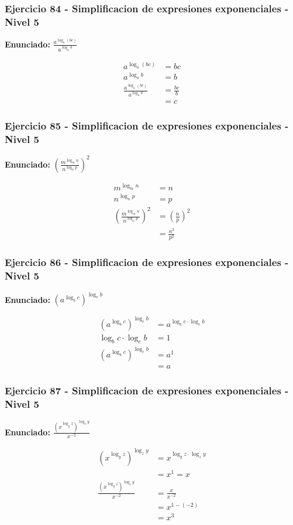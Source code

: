 \documentclass[12pt,a4paper]{article}
\begin{document}
\subsubsection*{Ejercicio 84 - Simplificacion de expresiones exponenciales - Nivel 5}
\textbf{Enunciado:} \(\frac{a^{\log_a(bc)}}{a^{\log_a b}}\)

\[
\begin{aligned}
a^{\log_a(bc)}&=bc\\
a^{\log_a b}&=b\\
\frac{a^{\log_a(bc)}}{a^{\log_a b}}&=\frac{bc}{b}\\
&=\boxed{c}
\end{aligned}
\]


\subsubsection*{Ejercicio 85 - Simplificacion de expresiones exponenciales - Nivel 5}
\textbf{Enunciado:} \(\left(\frac{m^{\log_m n}}{n^{\log_n p}}\right)^2\)

\[
\begin{aligned}
m^{\log_m n}&=n\\
n^{\log_n p}&=p\\
\left(\frac{m^{\log_m n}}{n^{\log_n p}}\right)^2&=\left(\frac np\right)^2\\
&=\boxed{\frac{n^2}{p^2}}
\end{aligned}
\]


\subsubsection*{Ejercicio 86 - Simplificacion de expresiones exponenciales - Nivel 5}
\textbf{Enunciado:} \((a^{\log_b c})^{\log_c b}\)

\[
\begin{aligned}
(a^{\log_b c})^{\log_c b}&=a^{\log_b c\cdot\log_c b}\\
\log_b c\cdot\log_c b&=1\\
(a^{\log_b c})^{\log_c b}&=a^1\\
&=\boxed{a}
\end{aligned}
\]


\subsubsection*{Ejercicio 87 - Simplificacion de expresiones exponenciales - Nivel 5}
\textbf{Enunciado:} \(\frac{(x^{\log_y z})^{\log_z y}}{x^{-2}}\)

\[
\begin{aligned}
(x^{\log_y z})^{\log_z y}&=x^{\log_y z\cdot\log_z y}\\
&=x^1=x\\
\frac{(x^{\log_y z})^{\log_z y}}{x^{-2}}&=\frac{x}{x^{-2}}\\
&=x^{1-(-2)}\\
&=\boxed{x^3}
\end{aligned}
\]
\end{document}
